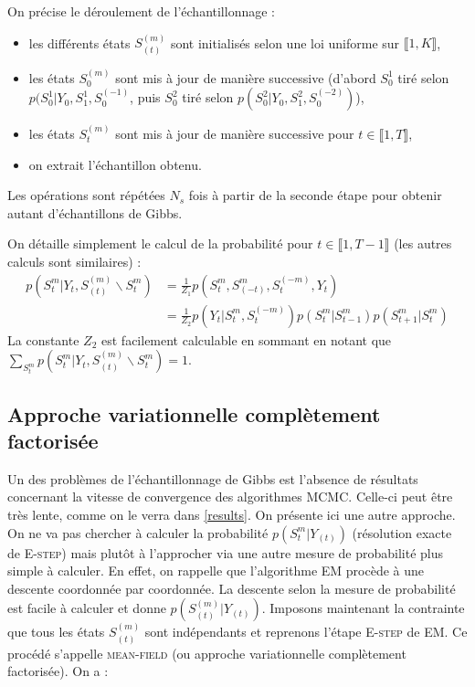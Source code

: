 \documentclass[10pt,a4paper]{article}
\newcommand{\mcmc}{\textsc{MCMC}}
\newcommand{\Estep}{\textsc{E-step}}
\newcommand{\EM}{\textsc{EM}}
\newcommand{\meanfield}{\textsc{mean-field}}
\begin{document}
On précise le déroulement de l'échantillonnage :
\begin{itemize}
  \item les différents états $S_{(t)}^{(m)}$ sont initialisés selon une loi 
    uniforme sur $\llbracket 1,K \rrbracket$,
  \item les états $S_0^{(m)}$ sont mis à jour de manière successive (d'abord 
    $S_0^1$ tiré selon $p(S_0^1 \vert Y_{0}, S_1^1, S_0^{(-1)}$, puis $S_0^2$ tiré 
    selon $p(S_0^2 \vert Y_{0}, S_1^2, S_0^{(-2)})$),
  \item les états $S_t^{(m)}$ sont mis à jour de manière successive pour $t \in 
    \llbracket 1,T \rrbracket$,
  \item on extrait l'échantillon obtenu.
\end{itemize}
Les opérations sont répétées $N_s$ fois à partir de la seconde étape pour
obtenir autant d'échantillons de Gibbs.

On détaille simplement le calcul de la probabilité pour $t \in \llbracket 1,T-1 
\rrbracket$ (les autres calculs sont similaires) :
\begin{equation}
\begin{aligned}
p(S_t^m \vert Y_t, S_{(t)}^{(m)} \backslash S_t^m)&=\frac{1}{Z_1}p(S_t^{m}, 
S_{(-t)}^{m}, S_{t}^{(-m)},Y_t) \\
&=\frac{1}{Z_2}p(Y_t \vert S_t^{m},S_t^{(-m)}) p(S_t^m \vert S_{t-1}^m) 
p(S_{t+1}^m \vert S_t^m)
\end{aligned}
\end{equation}
La constante $Z_2$ est facilement calculable en sommant en notant que 
$\underset{S_t^m}{\sum}p(S_t^m \vert Y_t, S_{(t)}^{(m)} \backslash S_t^m)=1$.

\subsection{Approche variationnelle complètement factorisée}

Un des problèmes de l'échantillonnage de Gibbs est l'absence de résultats 
concernant la vitesse de convergence des algorithmes \mcmc.
Celle-ci peut être très lente, comme on le verra dans \ref{results}.
On présente ici une autre approche.
On ne va pas chercher à calculer la probabilité $p( S_t^m \vert Y_{(t)})$
(résolution exacte de \Estep{}) mais plutôt à l'approcher via une autre mesure
de probabilité plus simple à calculer.
En effet, on rappelle que l'algorithme \EM{} procède à une descente coordonnée
par coordonnée.
La descente selon la mesure de probabilité est facile à calculer et donne
$p(S_{(t)}^{(m)} \vert Y_{(t)})$.
Imposons maintenant la contrainte que tous les états $S_{(t)}^{(m)}$ sont
indépendants et reprenons l'étape \Estep{} de \EM.
Ce procédé s'appelle \meanfield{} (ou approche variationnelle complètement
factorisée).
On a :
\end{document}
